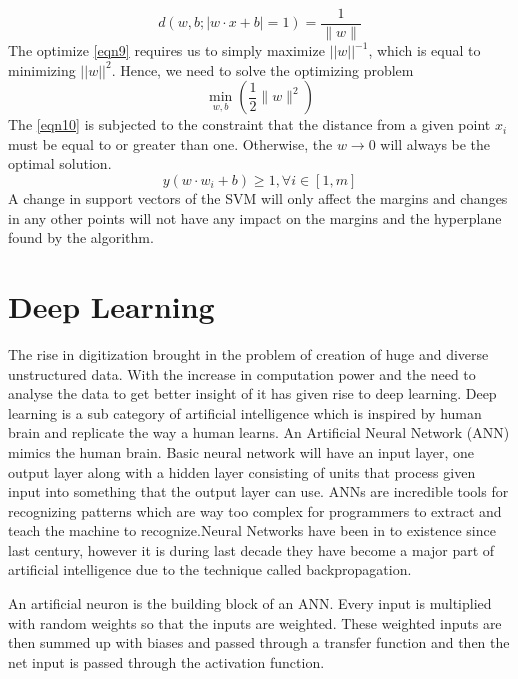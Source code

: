 \begin{equation} \label{eqn9}
    d ( w , b ; | w \cdot x + b | = 1 ) = \frac { 1 } { \| w \| }
\end{equation}
The optimize \ref{eqn9} requires us to simply maximize $| | w | | ^ { - 1 }$, which is equal to minimizing $| | w | | ^ { 2 }$. Hence, we need to solve the optimizing problem
\begin{equation} \label{eqn10}
    \min _ { w , b } \left( \frac { 1 } { 2 } \| w \| ^ { 2 } \right)
\end{equation}
The \ref{eqn10} is subjected to the constraint that the distance from a given point $x_i$ must be equal to or greater than one. Otherwise, the $w \rightarrow 0$ will always be the optimal solution. 
\begin{equation} \label{eqn11}
    y \left( w \cdot w _ { i } + b \right) \geq 1 , \forall i \in [ 1 , m ]
\end{equation}
A change in support vectors of the \gls{SVM} will only affect the margins and changes in any other points will not have any impact on the margins and the hyperplane found by the algorithm.

\section{Deep Learning} \label{sec:DeepLearning}

The rise in digitization brought in the problem of creation of huge and diverse unstructured data. With the increase in computation power and the need to analyse the data to get better insight of it has given rise to deep learning. Deep learning is a sub category of artificial intelligence which is inspired by human brain and replicate the way a human learns. An Artificial Neural Network (ANN) mimics the human brain. Basic neural network will have an input layer, one output layer along with a hidden layer consisting of units that process given input into something that the output layer can use.   ANNs are incredible tools for recognizing patterns which are way too complex for programmers to extract and teach the machine to recognize.Neural Networks have been in to existence since last century, however it is during last decade they have become a major part of artificial intelligence due to the technique called backpropagation.

An artificial neuron is the building block of an ANN. Every input is multiplied with random weights so that the inputs are weighted.  These weighted inputs are then summed up with biases and passed through a transfer function and then the net input is passed through the activation function.

